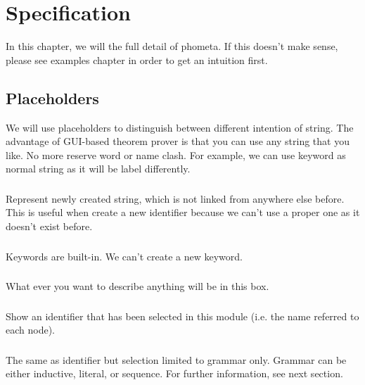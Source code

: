 

\chapter{Specification}
\label{chap:specification}

In this chapter, we will the full detail of phometa. If this doesn't make sense, please see examples chapter in order to get an intuition first.

\section{Placeholders}

We will use placeholders to distinguish between different intention of string. The advantage of GUI-based theorem prover is that you can use any string that you like. No more reserve word or name clash. For example, we can use keyword as normal string as it will be label differently.

\subsection{} Represent newly created string, which is not linked from anywhere else before. This is useful when create a new identifier because we can't use a proper one as it doesn't exist before.

\subsection{} Keywords are built-in. We can't create a new keyword.

\subsection{} What ever you want to describe anything will be in this box.

\subsection{} Show an identifier that has been selected in this module (i.e. the name referred to each node).

\subsection{} The same as identifier but selection limited to grammar only. Grammar can be either inductive, literal, or sequence. For further information, see next section.

